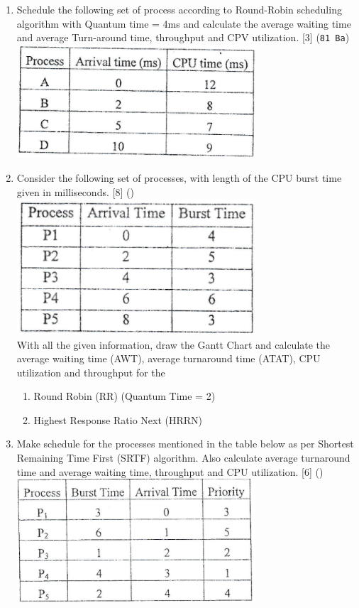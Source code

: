 \documentclass[12pt]{article}
\begin{document}
\begin{enumerate}
			\item Schedule the following set of process according to Round-Robin scheduling algorithm with Quantum time = 4ms and calculate the average waiting time and average Turn-around time, throughput and CPV utilization. \hfill [3] (\texttt{81 Ba})\\
			\includegraphics[width=3.5in]{./pics/os_2}
			
			\item Consider the following set of processes, with length of the CPU burst time given in milliseconds. \hspace{12.9cm} [8] ()\\
			\includegraphics[width=3.5in]{./pics/os_3}\\
			With all the given information, draw the Gantt Chart and calculate the average waiting time (AWT), average turnaround time (ATAT), CPU utilization and throughput for the
			\begin{enumerate}[noitemsep, topsep = 0pt, label = \alph*.]
				\item Round Robin (RR) (Quantum Time = 2)
				\item Highest Response Ratio Next (HRRN)
			\end{enumerate}
			
			\item Make  schedule for the processes mentioned in the table below as per Shortest Remaining Time First (SRTF) algorithm. Also calculate average turnaround time and average waiting time, throughput and CPU utilization. \hfill [6] ()
			\includegraphics[width=3.5in]{./pics/os_4}
			

\end{enumerate}
\end{document}
